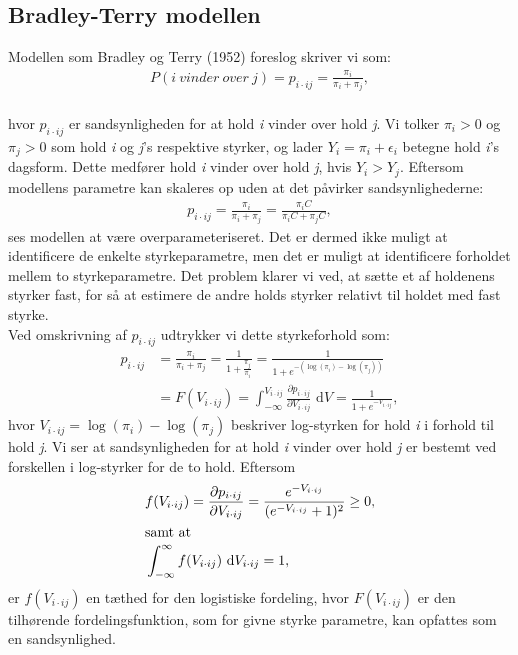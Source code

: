 \documentclass[11pt,a4paper]{article}
\begin{document}
\subsection{Bradley-Terry modellen}
Modellen som Bradley og Terry (1952)\cite{BradleyTerry} foreslog skriver vi som:
\begin{align*}
    P(i\ vinder\ over\ j) = p_{i\cdot ij} = \frac{\pi_i}{\pi_i+\pi_j},
\end{align*}
\\
hvor $p_{i\cdot ij}$ er sandsynligheden for at hold \textit{i} vinder over hold \textit{j}. Vi tolker $\pi_i>0$ og $\pi_j>0$ som hold \textit{i} og \textit{j}'s respektive styrker, og lader $Y_i=\pi_i+\epsilon_i$ betegne hold \textit{i}'s dagsform. Dette medfører hold \textit{i} vinder over hold \textit{j}, hvis $Y_i>Y_j$. 
Eftersom modellens parametre kan skaleres op uden at det påvirker sandsynlighederne:
\begin{align*}
p_{i\cdot ij} = \frac{\pi_i}{\pi_i+\pi_j} = \frac{\pi_iC}{\pi_iC+\pi_jC},
\end{align*}
ses modellen at være overparameteriseret. Det er dermed ikke muligt at identificere de enkelte styrkeparametre, men det er muligt at identificere forholdet mellem to styrkeparametre. Det problem klarer vi ved, at sætte et af holdenens styrker fast, for så at estimere de andre holds styrker relativt til holdet med fast styrke.\\
Ved omskrivning af $p_{i\cdot ij}$ udtrykker vi dette styrkeforhold som:
\begin{align*}
    p_{i\cdot ij} &= \frac{\pi_i}{\pi_i+\pi_j}=\frac{1}{1+\frac{\pi_j}{\pi_i}}=\frac{1}{1+e^{-(\log(\pi_i)-\log(\pi_j))}}\\
    &=F(V_{i\cdot ij})=\int_{-\infty}^{V_{i\cdot ij}} \frac{\partial p_{i\cdot ij}}{\partial V_{i\cdot ij}} \text{ d}V=\frac{1}{1+e^{-V_{i\cdot ij}}},
\end{align*}
hvor $V_{i\cdot ij}=\log(\pi_i)-\log(\pi_j)$ beskriver log-styrken for hold \textit{i} i forhold til hold \textit{j}. Vi ser at sandsynligheden for at hold \textit{i} vinder over hold \textit{j} er bestemt ved forskellen i log-styrker for de to hold. Eftersom 
\begin{align*}
&f(V_{i\cdot ij})=\frac{\partial p_{i\cdot ij}}{\partial V_{i\cdot ij}} = \frac{e^{-V_{i\cdot ij}}}{(e^{-V_{i\cdot ij}}+1)^2} \geq 0, \\ 
\intertext{samt at}
&\int_{-\infty}^\infty f(V_{i\cdot ij}) \text{  d} V_{i\cdot ij} = 1,
\end{align*}
er $f(V_{i\cdot ij})$ en tæthed for den logistiske fordeling, hvor $F(V_{i\cdot ij})$ er den tilhørende fordelingsfunktion, som for givne styrke parametre, kan opfattes som en sandsynlighed.\\
\end{document}

